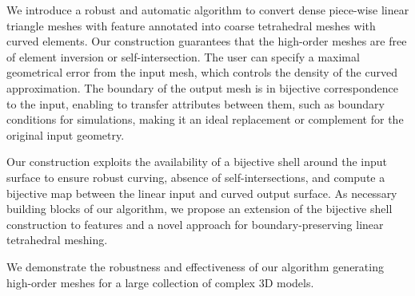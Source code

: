 We introduce a robust and automatic algorithm to convert dense piece-wise linear triangle meshes with feature annotated into coarse tetrahedral meshes with curved elements. 
Our construction guarantees that the high-order meshes are free of element inversion or self-intersection. 
The user can specify a maximal geometrical error from the input mesh, which  controls the density of the curved approximation. The boundary of the output mesh is in bijective correspondence to the input, enabling to transfer attributes between them, such as boundary conditions for simulations, making it an ideal replacement or complement for the original input geometry. 

Our construction exploits the availability of a bijective shell around the input surface to ensure robust curving, absence of self-intersections, and compute a bijective map between the linear input and curved output surface. As necessary building blocks of our algorithm, we propose an extension of the bijective shell construction to features and a novel approach for boundary-preserving linear tetrahedral meshing.

We demonstrate the robustness and effectiveness of our algorithm generating high-order meshes for a large collection of complex 3D models.